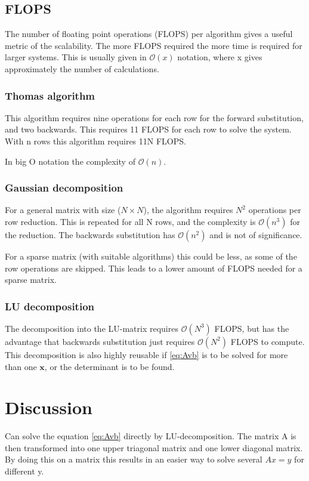 \documentclass[11pt,a4paper,english,final]{article}
\numberwithin{equation}{section}
\newcommand{\ve}[1]{\mathbf{#1}} %
\newcommand{\bigO}[1]{\mathcal{O}\left( #1 \right)}
\begin{document}
\subsection{FLOPS}

The number of floating point operations (FLOPS) per algorithm gives a useful 
metric of the scalability. The more FLOPS required the more time is
required for larger systems. This is usually given in $\bigO{x}$ notation,
where x gives approximately the number of calculations.

\subsubsection{Thomas algorithm}
This algorithm requires nine operations for each row for the forward substitution,
and two backwards. This requires 11 FLOPS for each row to solve the system.
With n rows this algorithm requires 11N FLOPS.

In big O notation the complexity of $\bigO{n}$.

\subsubsection{Gaussian decomposition}
For a general matrix with size ($N\times N$), the algorithm requires
$N^2$ operations per row reduction. This is repeated for all N rows,
and the complexity is $\bigO{n^3}$ for the reduction. The backwards 
substitution has $\bigO{n^2}$ and is not of significance.

For a sparse matrix (with suitable algorithms) this could be less, 
as some of the row operations are
skipped. This leads to a lower amount of FLOPS needed for a sparse
matrix.

\subsubsection{LU decomposition}
The decomposition into the LU-matrix requires $\bigO{N^3}$ FLOPS, but 
has the advantage that backwards substitution just requires $\bigO{N^2}$
FLOPS to compute. This decomposition is also highly reusable if \eqref{eq:Avb}
is to be solved for more than one $\ve{x}$, or the determinant is to be found.

\section{Discussion}

Can solve the equation \eqref{eq:Avb} directly by LU-decomposition.
The matrix A is then transformed into one upper triagonal matrix and
one lower diagonal matrix. By doing this on a matrix this results in an
easier way to solve several $Ax = y$ for different y.
\end{document}
